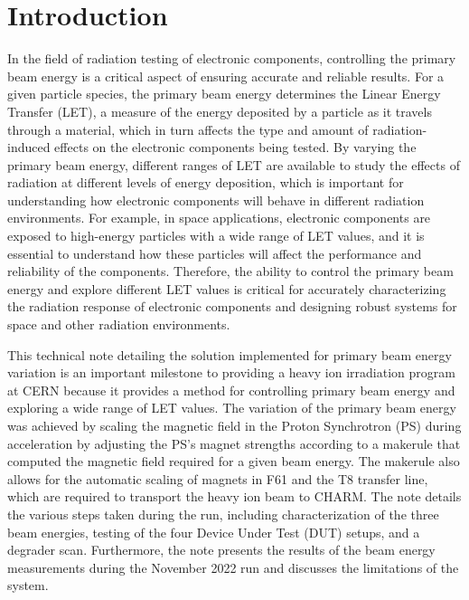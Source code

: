 \documentclass{cernatsnote}
\begin{document}
\section{Introduction}
In the field of radiation testing of electronic components, controlling the primary beam energy is a critical aspect of ensuring accurate and reliable results. For a given particle species, the primary beam energy determines the Linear Energy Transfer (LET), a measure of the energy deposited by a particle as it travels through a material, which in turn affects the type and amount of radiation-induced effects on the electronic components being tested. By varying the primary beam energy, different ranges of LET are available to study the effects of radiation at different levels of energy deposition, which is important for understanding how electronic components will behave in different radiation environments. For example, in space applications, electronic components are exposed to high-energy particles with a wide range of LET values, and it is essential to understand how these particles will affect the performance and reliability of the components. Therefore, the ability to control the primary beam energy and explore different LET values is critical for accurately characterizing the radiation response of electronic components and designing robust systems for space and other radiation environments.

This technical note detailing the solution implemented for primary beam energy variation is an important milestone to providing a heavy ion irradiation program at CERN because it provides a method for controlling primary beam energy and exploring a wide range of LET values. The variation of the primary beam energy was achieved by scaling the magnetic field in the Proton Synchrotron (PS) during acceleration by adjusting the PS's magnet strengths according to a makerule that computed the magnetic field required for a given beam energy. The makerule also allows for the automatic scaling of magnets in F61 and the T8 transfer line, which are required to transport the heavy ion beam to CHARM. The note details the various steps taken during the run, including characterization of the three beam energies, testing of the four Device Under Test (DUT) setups, and a degrader scan. Furthermore, the note presents the results of the beam energy measurements during the November 2022 run and discusses the limitations of the system.
\end{document}
